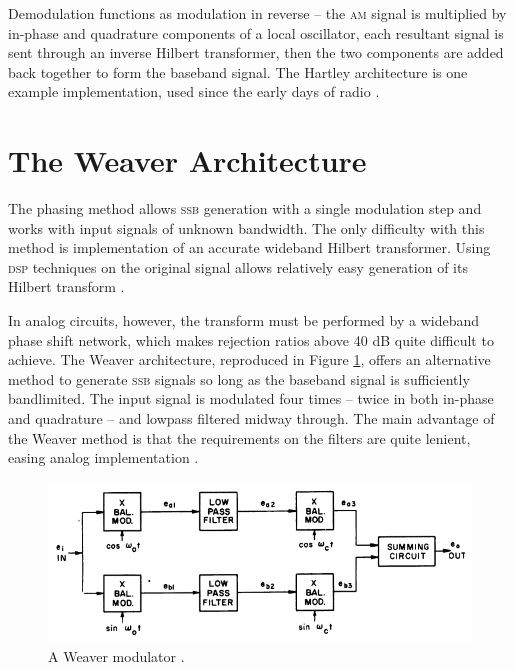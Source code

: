 \documentclass[12pt]{article}
\newcommand{\rf}{\textsc{am}\xspace}
\newcommand{\ssb}{\textsc{ssb}\xspace}
\begin{document}
Demodulation functions as modulation in reverse -- the \rf signal is multiplied
by in-phase and quadrature components of a local oscillator, each resultant
signal is sent through an inverse Hilbert transformer, then the two components
are added back together to form the baseband signal. The Hartley architecture
is one example implementation, used since the early days of radio
\autocite{rf-microelectronics}.

\section*{The Weaver Architecture}

\newcommand{\oo}{\omega_o}
\newcommand{\oc}{\omega_c}

The phasing method allows \ssb generation with a single modulation step and
works with input signals of unknown bandwidth. The only difficulty with this
method is implementation of an accurate wideband Hilbert transformer. Using
\textsc{dsp} techniques on the original signal allows relatively easy
generation of its Hilbert transform \autocite{ssb-tretter}.

In analog circuits, however, the transform must be performed by a wideband
phase shift network, which makes rejection ratios above 40 dB quite difficult
to achieve. The Weaver architecture, reproduced in Figure
\ref{fig:weaver-from-paper}, offers an alternative method to generate \ssb
signals so long as the baseband signal is sufficiently bandlimited. The input
signal is modulated four times -- twice in both in-phase and quadrature -- and
lowpass filtered midway through. The main advantage of the Weaver method is
that the requirements on the filters are quite lenient, easing analog
implementation \autocite{weaver-himself}.

\begin{figure}[h]
	\centering
	\includegraphics[width=.9\textwidth]{weaver-from-paper.png}
	\caption{A Weaver modulator \autocite{weaver-himself}.}
	\label{fig:weaver-from-paper}
\end{figure}
\end{document}
